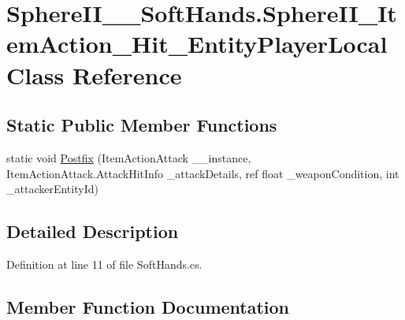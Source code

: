 \hypertarget{class_sphere_i_i_____soft_hands_1_1_sphere_i_i___item_action___hit___entity_player_local}{}\section{Sphere\+I\+I\+\_\+\+\_\+\+Soft\+Hands.\+Sphere\+I\+I\+\_\+\+Item\+Action\+\_\+\+Hit\+\_\+\+Entity\+Player\+Local Class Reference}
\label{class_sphere_i_i_____soft_hands_1_1_sphere_i_i___item_action___hit___entity_player_local}
\subsection*{Static Public Member Functions}
\begin{DoxyCompactItemize}
\item 
static void \mbox{\hyperlink{class_sphere_i_i_____soft_hands_1_1_sphere_i_i___item_action___hit___entity_player_local_a4f37f5bebc87eacbeb1168befb3d7bd8}{Postfix}} (Item\+Action\+Attack \+\_\+\+\_\+instance, Item\+Action\+Attack.\+Attack\+Hit\+Info \+\_\+attack\+Details, ref float \+\_\+weapon\+Condition, int \+\_\+attacker\+Entity\+Id)
\end{DoxyCompactItemize}


\subsection{Detailed Description}


Definition at line 11 of file Soft\+Hands.\+cs.



\subsection{Member Function Documentation}
\mbox{\label{class_sphere_i_i_____soft_hands_1_1_sphere_i_i___item_action___hit___entity_player_local_a4f37f5bebc87eacbeb1168befb3d7bd8}} 
